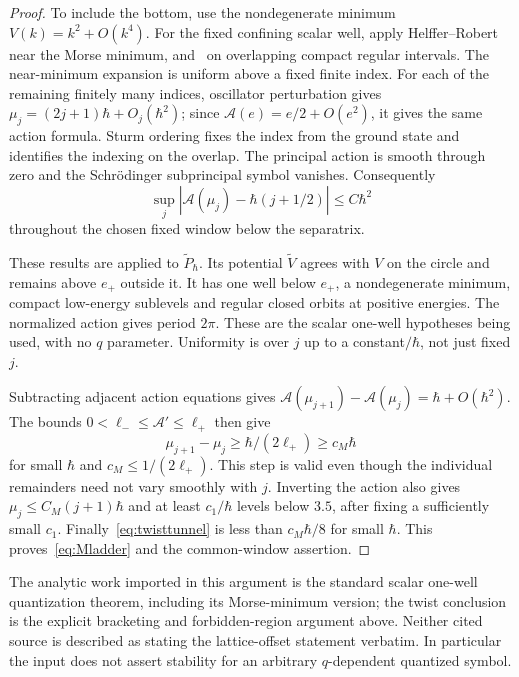 \begin{proof}
To include the bottom, use the nondegenerate minimum $V(k)=k^2+O(k^4)$. For the fixed confining scalar well, apply Helffer--Robert~\cite[Theorem~4.5 and Remark~4.9]{HelfferRobert} near the Morse minimum, and~\cite[Theorem~3.14 and Corollary~3.15]{HelfferRobert} on overlapping compact regular intervals. The near-minimum expansion is uniform above a fixed finite index. For each of the remaining finitely many indices, oscillator perturbation gives $\mu_j=(2j+1)\hbar+O_j(\hbar^2)$; since $\mathcal A(e)=e/2+O(e^2)$, it gives the same action formula. Sturm ordering fixes the index from the ground state and identifies the indexing on the overlap. The principal action is smooth through zero and the Schr\"odinger subprincipal symbol vanishes. Consequently
\[
 \sup_j|\mathcal A(\mu_j)-\hbar(j+1/2)|\le C\hbar^2
\]
throughout the chosen fixed window below the separatrix.

These results are applied to $\widetilde P_\hbar$. Its potential $\widetilde V$ agrees with $V$ on the circle and remains above $e_+$ outside it. It has one well below $e_+$, a nondegenerate minimum, compact low-energy sublevels and regular closed orbits at positive energies. The normalized action gives period $2\pi$. These are the scalar one-well hypotheses being used, with no $q$ parameter. Uniformity is over $j$ up to a constant$/\hbar$, not just fixed $j$.

Subtracting adjacent action equations gives $\mathcal A(\mu_{j+1})-\mathcal A(\mu_j)=\hbar+O(\hbar^2)$. The bounds $0<\ell_-\le\mathcal A'\le\ell_+$ then give
\[
 \mu_{j+1}-\mu_j\ge\hbar/(2\ell_+)\ge c_M\hbar
\]
for small $\hbar$ and $c_M\le1/(2\ell_+)$. This step is valid even though the individual remainders need not vary smoothly with $j$. Inverting the action also gives $\mu_j\le C_M(j+1)\hbar$ and at least $c_1/\hbar$ levels below $3.5$, after fixing a sufficiently small $c_1$. Finally~\eqref{eq:twisttunnel} is less than $c_M\hbar/8$ for small $\hbar$. This proves~\eqref{eq:Mladder} and the common-window assertion.
\end{proof}

The analytic work imported in this argument is the standard scalar one-well quantization theorem, including its Morse-minimum version; the twist conclusion is the explicit bracketing and forbidden-region argument above. Neither cited source is described as stating the lattice-offset statement verbatim. In particular the input does not assert stability for an arbitrary $q$-dependent quantized symbol.

